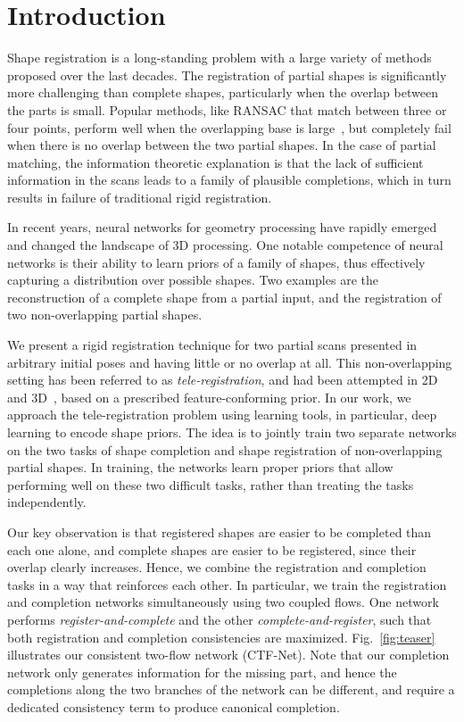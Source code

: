 \section{Introduction} \label{sec:intro}

Shape registration is a long-standing problem with a large variety of methods proposed over the last decades. The registration of partial shapes is significantly more challenging than complete shapes, particularly when the overlap between the parts is small. Popular methods, like RANSAC that match between three or four points, perform well when the overlapping base is large~\cite{fischler1981random, chen1999ransac, rusinkiewicz2001efficient, aiger20084pcs, segal2009generalized}, but completely fail when there is no overlap between the two partial shapes. In the case of partial matching, the information theoretic explanation is that the lack of sufficient information in the scans leads to a family of plausible completions, which in turn results in failure of traditional rigid registration. 

In recent years, neural networks for geometry processing have rapidly emerged and changed the landscape of 3D processing. One notable competence of neural networks is their ability to learn priors of a family of shapes, thus effectively capturing a distribution over possible shapes. Two examples are the reconstruction of a complete shape from a partial input, and the registration of two non-overlapping partial shapes.

We present a rigid registration technique for two partial scans  presented in arbitrary initial poses and having little or no overlap at all. This non-overlapping setting has been referred to as \textit{tele-registration}, and had been attempted in 2D~\cite{Huang2013} and 3D~\cite{Huang2012}, based on a prescribed feature-conforming prior. In our work, we approach the tele-registration problem using learning tools, in particular, deep learning to encode shape priors. The idea is to jointly train two separate networks on the two tasks of shape completion and shape registration of non-overlapping partial shapes.
In training, the networks learn proper priors that allow performing well on these two difficult tasks, rather than treating the tasks independently. 

Our key observation is that registered shapes are easier to be completed than each one alone, and complete shapes are easier to be registered, since their overlap clearly increases. Hence, we combine the registration and completion tasks in a way that reinforces each other. 
In particular, we train the registration and completion networks simultaneously using two coupled flows. One network performs \emph{register-and-complete} and the other \emph{complete-and-register}, such that both registration and completion consistencies are maximized. Fig.~\ref{fig:teaser} illustrates our consistent two-flow network (CTF-Net).
Note that our completion network only generates information for the missing part, and hence the completions along the two branches of the network can be different, and require a dedicated consistency term to produce canonical completion. 
	
